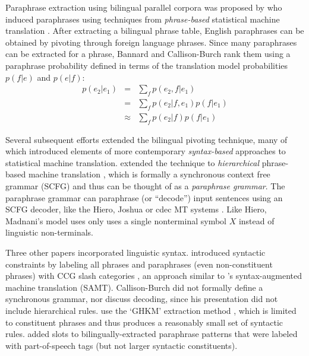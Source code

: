 \documentclass[11pt]{article}
\begin{document}
Paraphrase extraction using bilingual parallel corpora was proposed by
 who induced paraphrases using techniques
from {\it phrase-based} statistical machine translation
\cite{Koehn2003}. After extracting a bilingual phrase table, English
paraphrases can be obtained by pivoting through foreign language
phrases.
Since many paraphrases can be extracted for a phrase, Bannard and
Callison-Burch rank them using a paraphrase probability defined in
terms of the translation model probabilities $p(f | e)$ and $p(e |
f)$: \nocite{Callison-Burch2005}
\begin{eqnarray}
  p(e_2|e_1) &=& \sum_f p(e_2,f|e_1)\\
                  &=& \sum_f p(e_2|f,e_1) p(f|e_1) \\
                  &\approx& \sum_f p(e_2|f) p(f|e_1)
\label{paraphrase_prob_eqn}
\end{eqnarray}

Several subsequent efforts extended the bilingual pivoting technique,
many of which introduced elements of more contemporary {\it
  syntax-based} approaches to statistical machine translation.
 extended the technique to {\it hierarchical}
phrase-based machine translation \cite{Chiang2005}, which is formally
a synchronous context free grammar (SCFG) and thus can be thought of
as a {\it paraphrase grammar}. The paraphrase grammar can paraphrase
(or ``decode'') input sentences using an SCFG decoder, like the Hiero,
Joshua or cdec MT systems \cite{Chiang2007,Joshua-WMT,Dyer_etal_2010}.
Like Hiero, Madnani's model uses only uses a single nonterminal symbol
$X$ instead of linguistic non-terminals.


Three other papers incorporated linguistic
syntax.  introduced syntactic constraints
by labeling all phrases and paraphrases (even non-constituent phrases)
with CCG slash categories \cite{Steedman1999}, an approach similar to
's syntax-augmented machine translation
(SAMT). Callison-Burch did not formally define a synchronous grammar,
nor discuss decoding, since his presentation did not include
hierarchical rules.   use the `GHKM'
extraction method \cite{Galley2004}, which is limited to constituent
phrases and thus produces a reasonably small set of syntactic rules.
 added slots to bilingually-extracted paraphrase
patterns that were labeled with part-of-speech tags (but not larger
syntactic constituents).
\end{document}
